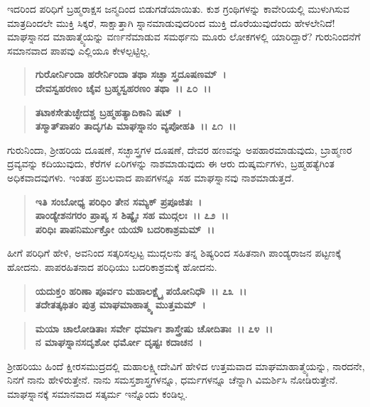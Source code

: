 ಇದರಿಂದ ಪರಿಧಿಗೆ ಬ್ರಹ್ಮರಾಕ್ಷಸ ಜನ್ಮದಿಂದ ಬಿಡುಗಡೆಯಾಯಿತು. ಕುಶ ಗ್ರಂಥಿಗಳನ್ನು ಕಾವೇರಿಯಲ್ಲಿ ಮುಳುಗಿಸುವ ಮಾತ್ರದಿಂದಲೇ ಮುಕ್ತಿ ಸಿಕ್ಕರೆ, ಸಾಕ್ಷಾತ್ತಾಗಿ ಸ್ನಾನಮಾಡುವುದರಿಂದ ಮುಕ್ತಿ ದೊರೆಯುವುದೆಂದು ಹೇಳಲೇನಿದೆ! ಮಾಘಸ್ನಾನದ ಮಾಹಾತ್ಮ್ಯೆಯನ್ನು ವರ್ಣನೆ\-ಮಾಡುವ ಸಮರ್ಥನು ಮೂರು ಲೋಕಗಳಲ್ಲಿ ಯಾರಿದ್ದಾರೆ? ಗುರುನಿಂದನೆಗೆ ಸಮಾನವಾದ ಪಾಪವು ಎಲ್ಲಿಯೂ ಕೇಳಲ್ಪಟ್ಟಿಲ್ಲ.

\begin{verse}
\textbf{ಗುರೋರ್ನಿಂದಾ ಹರೇರ್ನಿಂದಾ ತಥಾ ಸಚ್ಛಾ ಸ್ತ್ರದೂಷಣಮ್~।}\\\textbf{ದೇವಸ್ವಹರಣಂ ಚೈವ ಬ್ರಹ್ಮಸ್ವಹರಣಂ ತಥಾ~।। ೭೦~।।} 
\end{verse}

\begin{verse}
\textbf{ತಟಾಕಸೇತುಚ್ಛೇದಶ್ಚ ಬ್ರಹ್ಮಹತ್ಯಾದಿಕಾನಿ ಷಟ್~।}\\\textbf{ತಸ್ಮಾತ್‌ಪಾಪಂ ತಾದೃಗಪಿ ಮಾಘಸ್ನಾನಂ ವ್ಯಪೋಹತಿ~।। ೭೧~।।}
\end{verse}

ಗುರುನಿಂದಾ, ಶ‍್ರೀಹರಿಯ ದೂಷಣೆ, ಸಚ್ಛಾಸ್ತ್ರಗಳ ದೂಷಣೆ, ದೇವರ ಹಣವನ್ನು ಅಪಹಾರಮಾಡುವುದು, ಬ್ರಾಹ್ಮಣರ ದ್ರವ್ಯವನ್ನು ಕದಿಯುವುದು, ಕೆರೆಗಳ ಏರಿಗಳನ್ನು ನಾಶಮಾಡುವುದು ಈ ಆರು ದುಷ್ಕರ್ಮಗಳು, ಬ್ರಹ್ಮಹತ್ಯೆಗಿಂತ ಅಧಿಕವಾದವುಗಳು. ಇಂತಹ ಪ್ರಬಲವಾದ ಪಾಪಗಳನ್ನೂ ಸಹ ಮಾಘಸ್ನಾನವು ನಾಶಮಾಡುತ್ತದೆ.

\begin{verse}
\textbf{ಇತಿ ಸಂಬೋಧ್ಯ ಪರಿಧಿಂ ತೇನ ಸಮ್ಯಕ್ ಪ್ರಪೂಜಿತಃ~।}\\\textbf{ಪಾಂಡ್ಯೇಶನಗರಂ ಪ್ರಾಪ್ಯ ಸ ಶಿಷ್ಯೈಃ ಸಹ ಮುದ್ಗಲಃ~।। ೭೨~।।}\\\textbf{ಪರಿಧಿಃ ಪಾಪನಿರ್ಮುಕ್ತೋ ಯಯೌ ಬದರಿಕಾಶ್ರಮಮ್~।।}
\end{verse}

ಹೀಗೆ ಪರಿಧಿಗೆ ಹೇಳಿ, ಅವನಿಂದ ಸತ್ಕರಿಸಲ್ಪಟ್ಟ ಮುದ್ಗಲನು ತನ್ನ ಶಿಷ್ಯರಿಂದ ಸಹಿತನಾಗಿ ಪಾಂಡ್ಯರಾಜನ ಪಟ್ಟಣಕ್ಕೆ ಹೋದನು. ಪಾಪರಹಿತನಾದ ಪರಿಧಿಯು ಬದರಿಕಾಶ್ರಮಕ್ಕೆ ಹೋದನು.

\begin{verse}
\textbf{ಯದುಕ್ತಂ ಹರಿಣಾ ಪೂರ್ವಂ ಮಹಾಲಕ್ಷ್ಮೈ ಪಯೋನಿಧೌ~।। ೭೩~।।}\\\textbf{ತದೇತತ್ಕಥಿತಂ ಪುತ್ರ ಮಾಘಮಾಹಾತ್ಮ್ಯ ಮುತ್ತಮಮ್~। }
\end{verse}

\begin{verse}
\textbf{ಮಯಾ ಚಾಲೋಡಿತಾಃ ಸರ್ವೇ ಧರ್ಮಾಃ ಶಾಸ್ತ್ರೇಷು ಚೋದಿತಾಃ~।। ೭೪~।।}\\\textbf{ನ ಮಾಘಸ್ನಾನಸದೃಶೋ ಧರ್ಮೋ ದೃಷ್ಟಃ ಕದಾಚನ~।}
\end{verse}

ಶ‍್ರೀಹರಿಯು ಹಿಂದೆ ಕ್ಷೀರಸಮುದ್ರದಲ್ಲಿ ಮಹಾಲಕ್ಷ್ಮೀದೇವಿಗೆ ಹೇಳಿದ ಉತ್ತಮವಾದ ಮಾಘಮಾಹಾತ್ಮ್ಯೆಯನ್ನು, ನಾರದನೇ, ನಿನಗೆ ನಾನು ಹೇಳಿರುತ್ತೇನೆ. ನಾನು ಸಮಸ್ತಶಾಸ್ತ್ರ\break ಗಳನ್ನೂ, ಧರ್ಮಗಳನ್ನೂ ಚೆನ್ನಾಗಿ ವಿಮರ್ಶಿಸಿ ನೋಡಿರುತ್ತೇನೆ. ಮಾಘಸ್ನಾನಕ್ಕೆ ಸಮಾನವಾದ ಸತ್ಕರ್ಮ ಇನ್ನೊಂದು ಕಂಡಿಲ್ಲ.

